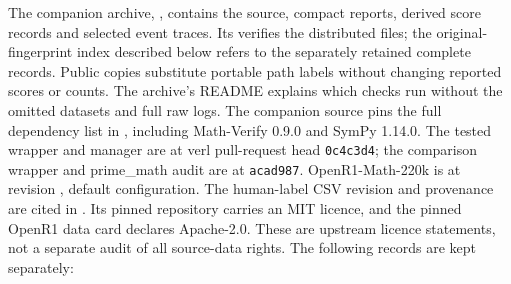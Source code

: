 \documentclass[10pt,a4paper]{article}
\let\cite\citep
\begin{document}
The companion archive, , contains the source,
compact reports, derived score records and selected event traces.
Its  verifies the distributed files; the
original-fingerprint index described below refers to the separately
retained complete records. Public copies substitute portable path labels
without changing reported scores or counts. The archive's README explains
which checks run without the omitted datasets and full raw logs.
The companion source pins the full dependency list in
, including Math-Verify 0.9.0 and SymPy 1.14.0.
The tested wrapper and manager are at verl pull-request head
\texttt{0c4c3d4}; the comparison wrapper and prime\_math audit are at
\texttt{acad987}. OpenR1-Math-220k is at revision
, default configuration.
The human-label CSV revision and provenance are cited in
\cite{humanlabels}. Its pinned repository carries an MIT licence, and the
pinned OpenR1 data card declares Apache-2.0. These are upstream licence
statements, not a separate audit of all source-data rights. The following
records are kept separately:
\end{document}
